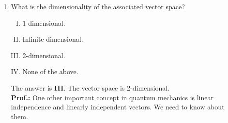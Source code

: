 \documentclass[12pt]{article}
\newcommand\half{\frac{1}{2}}
\newcommand\tbf[1]{\textbf{#1}}
\newcommand\ta{\tbf{Alice: }}
\newcommand\tp{\tbf{Prof.: }}
\newcommand\none{None of the above.}
\begin{document}
\begin{enumerate}[1.]
\begin{enumerate}[a)]
			\item Energy eigenstates of the harmonic oscillator.
			\item Polarization states of a photon. \\ \newline
		\end{enumerate}
		\begin{enumerate}[I.]
			\item a and b.
			\item b and c.
			\item d only.
			\item a and d. \\ \newline
 		\end{enumerate}
 		The correct answer is \tbf{IV}. The electron is a spin half particle,  so its $z$ component is $+\half$ and $-\half$. The photon is a spin $1$ particle, so it can have three states $\pm 1$ and $0$. But, the particle being relativistic, it is not allowed to have the zero state (which is a prediction of quantum field theory). So it also has two states. Therefore, `a' and `d' can be QuBits. \\ \newline
 \ta But why do we care about quantum mechanics at all? \newline
 \tp Well, Alice. Classically we can not by any means transfer a key safely over a public channel. You can not know if someone is eavesdropping. Quantum mechanics, on the other hand, saves us there. But to understand the how, we need to review some concepts of quantum mechanics first. \newline
 \ta Sounds great! \newline
 \tp Tell me, if I have a two state system in quantum mechanics, then,
 	\item What is the dimensionality of the associated vector space?
 	\begin{enumerate}[I.]
 		\item 1-dimensional.
 		\item Infinite dimensional.
 		\item 2-dimensional.
 		\item \none \newline
 	\end{enumerate}
 	The answer is \tbf{III}. The vector space is 2-dimensional. \\ \newline
 \tp One other important concept in quantum mechanics is linear independence and linearly independent vectors. We need to know about them.

\end{enumerate}
\end{document}
